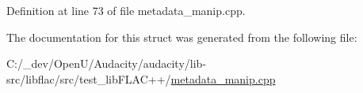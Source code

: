 Definition at line 73 of file metadata\+\_\+manip.\+cpp.



The documentation for this struct was generated from the following file\+:\begin{DoxyCompactItemize}
\item 
C\+:/\+\_\+dev/\+Open\+U/\+Audacity/audacity/lib-\/src/libflac/src/test\+\_\+lib\+F\+L\+A\+C++/\hyperlink{metadata__manip_8cpp}{metadata\+\_\+manip.\+cpp}\end{DoxyCompactItemize}
